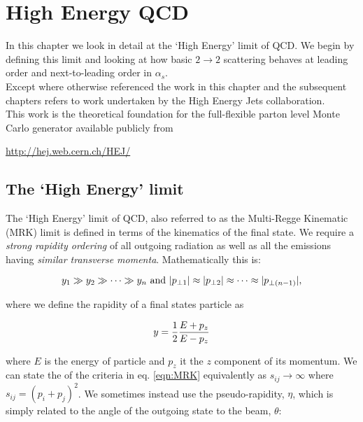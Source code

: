  \chapter{High Energy QCD}
\label{chap:HEQCD}

	In this chapter we look in detail at the `High Energy' limit of QCD.  We begin by defining this limit and
	looking at how basic $2\rightarrow2$ scattering behaves at leading order and next-to-leading order in
	$\alpha_s$.\\Except where otherwise referenced the work in this chapter and the subsequent chapters refers to
	work undertaken by the High Energy Jets collaboration.\\This work is the theoretical foundation for the
	full-flexible parton level Monte Carlo generator available publicly from

	\begin{center}
	\url{http://hej.web.cern.ch/HEJ/}
	\end{center}

	\section{The `High Energy' limit}
		\label{sub:HElimit}

		The `High Energy' limit of QCD, also referred to as the Multi-Regge Kinematic (MRK) limit is
		defined in terms of the kinematics of the final state.  We require a \emph{strong rapidity ordering}
		of all outgoing radiation as well as all the emissions having \emph{similar transverse momenta}.
		Mathematically this is:

		\begin{equation}
			y_1\gg y_2\gg\cdots\gg\\y_n \text{ and } |p_{\perp1}| \approx |p_{\perp2}| \approx\cdots\approx|p_{\perp(n-1)}|,
			\label{eqn:MRK}
		\end{equation}

  		where we define the rapidity of a final states particle as

		\begin{equation}
			y = \frac{1}{2}\frac{E+p_z}{E-p_z}
			\label{eqn:rap}
		\end{equation}

		where $E$ is the energy of particle and $p_z$ it the $z$ component of its momentum. We can
		state the of the criteria in eq. \eqref{eqn:MRK} equivalently as $s_{ij}\rightarrow\infty$ where
		$s_{ij} = (p_i + p_j)^2$.  We sometimes instead use the pseudo-rapidity, $\eta$, which is
		simply related to the angle of the outgoing state to the beam, $\theta$:


